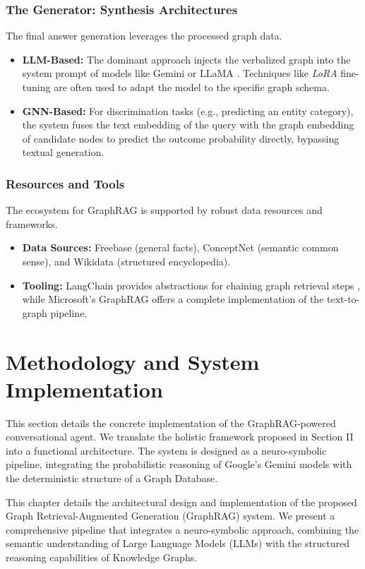 \documentclass[a4paper, 12pt]{extreport}
\begin{document}
\subsection{The Generator: Synthesis Architectures}
The final answer generation leverages the processed graph data.
\begin{itemize}
    \item[] \textbf{LLM-Based:} The dominant approach injects the verbalized graph into the system prompt of models like Gemini or LLaMA \cite{team2023gemini, touvron2023llama}. Techniques like \textit{LoRA} fine-tuning are often used to adapt the model to the specific graph schema.
    \item[] \textbf{GNN-Based:} For discrimination tasks (e.g., predicting an entity category), the system fuses the text embedding of the query with the graph embedding of candidate nodes to predict the outcome probability directly, bypassing textual generation.
\end{itemize}

\subsection{Resources and Tools}
The ecosystem for GraphRAG is supported by robust data resources and frameworks.
\begin{itemize}
    \item[] \textbf{Data Sources:} Freebase (general facts), ConceptNet (semantic common sense), and Wikidata (structured encyclopedia).
    \item[] \textbf{Tooling:} LangChain provides abstractions for chaining graph retrieval steps \cite{langchain2023}, while Microsoft's GraphRAG offers a complete implementation of the text-to-graph pipeline.
\end{itemize}

\chapter{Methodology and System Implementation}

This section details the concrete implementation of the GraphRAG-powered conversational agent. We translate the holistic framework proposed in Section II into a functional architecture. The system is designed as a neuro-symbolic pipeline, integrating the probabilistic reasoning of Google's Gemini models with the deterministic structure of a Graph Database.

This chapter details the architectural design and implementation of the proposed Graph Retrieval-Augmented Generation (GraphRAG) system. We present a comprehensive pipeline that integrates a neuro-symbolic approach, combining the semantic understanding of Large Language Models (LLMs) with the structured reasoning capabilities of Knowledge Graphs.
\end{document}
